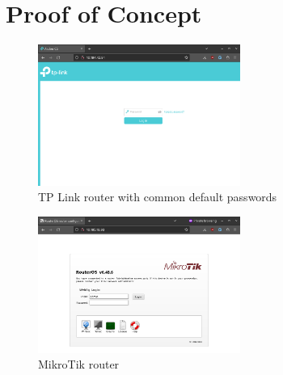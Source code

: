 \documentclass[11pt]{article}
\begin{document}
    \section{Proof of Concept}\label{sec:poc}
    \begin{figure}[!htb]
        \centering
        \includegraphics[width=250]{./poc/tplink-archer-c5-1}
        \caption{TP Link router with common default passwords}
        \label{fig:2}
    \end{figure}
    \begin{figure}[!htb]
        \centering
        \includegraphics[width=250]{./poc/mikrotik}
        \caption{MikroTik router}
        \label{fig:3}
    \end{figure}
\end{document}
